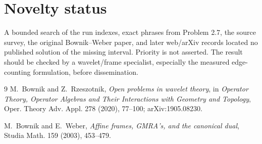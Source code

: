 \documentclass[11pt]{article}
\begin{document}
\section{Novelty status}

A bounded search of the run indexes, exact phrases from Problem 2.7, the
source survey, the original Bownik--Weber paper, and later web/arXiv records
located no published solution of the missing interval.  Priority is not
asserted.  The result should be checked by a wavelet/frame specialist,
especially the measured edge-counting formulation, before dissemination.

\begin{thebibliography}{9}
M.~Bownik and Z.~Rzeszotnik,
\emph{Open problems in wavelet theory},
in \emph{Operator Theory, Operator Algebras and Their Interactions with
Geometry and Topology}, Oper. Theory Adv. Appl. 278 (2020), 77--100;
arXiv:1905.08230.

M.~Bownik and E.~Weber,
\emph{Affine frames, GMRA's, and the canonical dual},
Studia Math. 159 (2003), 453--479.
\end{thebibliography}
\end{document}
